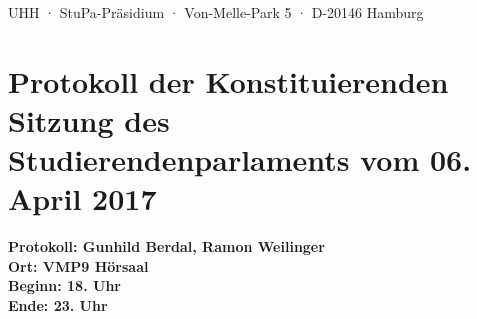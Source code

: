 \documentclass[ngerman,headheight=70pt]{scrartcl}
\begin{document}
    UHH · StuPa-Präsidium · Von-Melle-Park 5 · D-20146 Hamburg

    \section*{Protokoll der Konstituierenden Sitzung des Studierendenparlaments vom 06. April 2017}

    \textbf{Protokoll: Gunhild Berdal, Ramon Weilinger}\\
    \textbf{Ort: VMP9 Hörsaal}\\
    \textbf{Beginn: 18. Uhr}\\
    \textbf{Ende: 23. Uhr}

    \vspace{0.5cm}
\end{document}
